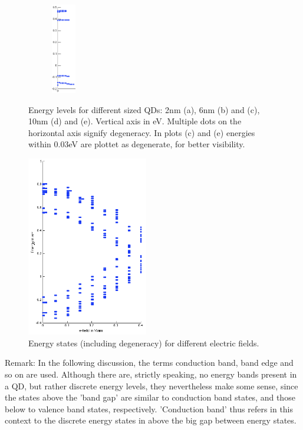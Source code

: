 \begin{figure}
\begin{subfigure}{60px}
		\caption{}
	\end{subfigure}    
	\begin{subfigure}{60px}
		\includegraphics[height=150px]{Fig/Plots/r5a.png}
		\caption{}
	\end{subfigure}
	\caption{Energy levels for different sized QDs: 2nm (a), 6nm (b) and (c), 10nm (d) and (e). Vertical axis in eV. Multiple dots on the horizontal axis signify degeneracy. In plots (c) and (e) energies within 0.03eV are plottet as degenerate, for better visibility.}
	\label{fig:e-levels}	
\end{figure}

\begin{figure}
	\centering
	\includegraphics[width=200px]{Fig/Plots/r25v.png}
	\caption{Energy states (including degeneracy) for different electric fields.}
	\label{fig:EvsVolt}
\end{figure}
	Remark: In the following discussion, the terms conduction band, band edge and so on are used. Although there are, strictly speaking, no energy bands present in a QD, but rather discrete energy levels, they nevertheless make some sense, since the states above the 'band gap' are similar to conduction band states, and those below to valence band states, respectively.  'Conduction band' thus refers in this context to the discrete energy states in above the big gap between energy states.
	
